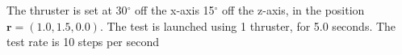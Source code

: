 The thruster is set at 30$^\circ$ off the x-axis 15$^\circ$ off the z-axis, in the position $\bm r = \left(1.0,1.5,0.0\right)$. The test is launched using 1 thruster, for 5.0 seconds. The test rate is 10 steps per second